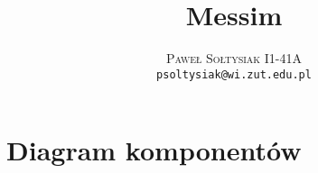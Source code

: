 \documentclass{article}
\title{Messim}
\author{\textsc{Paweł Sołtysiak I1-41A} \\ \texttt{psoltysiak@wi.zut.edu.pl}}
\begin{document}
\maketitle

\section{Diagram komponentów}
\end{document}
